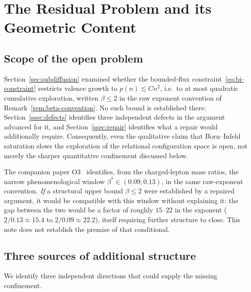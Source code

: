 \documentclass[11pt,a4paper]{article}
\theoremstyle{definition}
\theoremstyle{remark}
\begin{document}
  \section{The Residual Problem and its Geometric Content}
  \label{sec:residual}

  \subsection{Scope of the open problem}
    \label{ssec:scope}

    Section~\ref{sec:subdiffusion} examined whether the bounded-flux
    constraint~\eqref{eq:bi-constraint} restricts valence growth to $p(n) \lesssim C n^2$,
    i.e.\ to at most quadratic cumulative exploration, written $\beta \leq 2$ in the raw
    exponent convention of Remark~\ref{rem:beta-convention}.
    No such bound is established there: Section~\ref{ssec:defects} identifies three
    independent defects in the argument advanced for it, and Section~\ref{ssec:repair}
    identifies what a repair would additionally require.
    Consequently, even the qualitative claim that Born--Infeld saturation slows the
    exploration of the relational configuration space is open, not merely the sharper
    quantitative confinement discussed below.

    The companion paper O3~\cite{Beau2026a7} identifies, from the charged-lepton mass ratios,
    the narrow phenomenological window $\beta^* \in (0.09, 0.13)$, in the same raw-exponent
    convention.
    \emph{If} a structural upper bound $\beta \leq 2$ were established by a repaired argument,
    it would be compatible with this window without explaining it: the gap between the two
    would be a factor of roughly $15$--$22$ in the exponent ($2/0.13 \approx 15.4$ to
    $2/0.09 \approx 22.2$), itself requiring further structure to close.
    This note does not establish the premise of that conditional.

  \subsection{Three sources of additional structure}
    \label{ssec:three-sources}

    We identify three independent directions that could supply the missing confinement.
\end{document}
